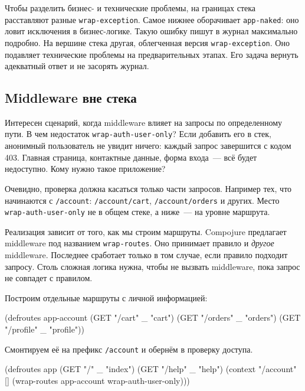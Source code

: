Чтобы разделить бизнес- и технические проблемы, на границах стека расставляют
разные \verb|wrap-exception|. Самое нижнее оборачивает \verb|app-naked|: оно
ловит исключения в бизнес-логике. Такую ошибку пишут в журнал максимально
подробно. На вершине стека другая, облегченная версия \verb|wrap-exception|.
Оно подавляет технические проблемы на предварительных этапах. Его задача вернуть
адекватный ответ и не засорять журнал.

\subsection{Middleware вне стека}


Интересен сценарий, когда middleware влияет на запросы по определенному пути. В
чем недостаток \verb|wrap-auth-user-only|? Если добавить его в стек, анонимный
пользователь не увидит ничего: каждый запрос завершится с кодом 403. Главная
страница, контактные данные, форма входа~--- всё будет недоступно. Кому
нужно такое приложение?

Очевидно, проверка должна касаться только части запросов. Например тех, что
начинаются с \verb|/account|: \verb|/account/cart|, \verb|/account/orders|
и других. Место \verb|wrap-auth-user-only| не в общем стеке, а ниже~--- на
уровне маршрута.

Реализация зависит от того, как мы строим маршруты. Compojure предлагает
middleware под названием \verb|wrap-routes|. Оно принимает правило и
\emph{другое} middleware. Последнее сработает только в том случае, если правило
подходит запросу. Столь сложная логика нужна, чтобы не вызвать middleware, пока
запрос не совпадет с правилом.

Построим отдельные маршруты с личной информацией:

\begin{english}
  \begin{clojure}
(defroutes app-account
  (GET "/cart"    _ "cart")
  (GET "/orders"  _ "orders")
  (GET "/profile" _ "profile"))
  \end{clojure}
\end{english}

\noindent
Смонтируем её на префикс \verb|/account| и обернём в проверку доступа.

\begin{english}
  \begin{clojure}
(defroutes app
  (GET "/"     _ "index")
  (GET "/help" _ "help")
  (context "/account" []
    (wrap-routes app-account wrap-auth-user-only)))
  \end{clojure}
\end{english}

